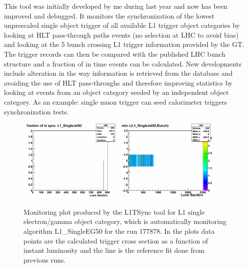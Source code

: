 
This tool was initially developed by me during last year and now has been improved and debugged. It monitors
the synchronization of the lowest unprescaled single object trigger of all available L1 trigger object categories
by looking at \gls{HLT} pass-through paths events (no selection at \gls{LHC} to avoid bias) and looking at the 5 bunch crossing
L1 trigger information provided by the GT. The trigger records can then be compared with the published LHC bunch
structure and a fraction of in time events can be calculated. New developments include alteration in the way
information is retrieved from the database and avoiding the use of \gls{HLT} pass-throughs and therefore improving statistics
by looking at events from an object category seeded by an independent object category. As an example: single muon
trigger can seed calorimeter triggers synchronization tests.

\begin{figure}[!htb]
\centering
\includegraphics[width=0.45\textwidth]{Chapter03/L1TOnline/Images/Run177878_Jet_SynchronizationCertification.png}
\includegraphics[width=0.45\textwidth]{Chapter03/L1TOnline/Images/Run177878_Jet_SynchronizationTest.png}
\caption{Monitoring plot produced by the L1TSync tool for L1 single electron/gamma object category, which is
automatically monitoring algorithm L1\_SingleEG50 for the run 177878. In the plots data points are the calculated
trigger cross section as a function of instant luminosity and the line is the reference fit done from previous runs.}
\label{figure_ServiceWork_L1TSync}
\end{figure}


